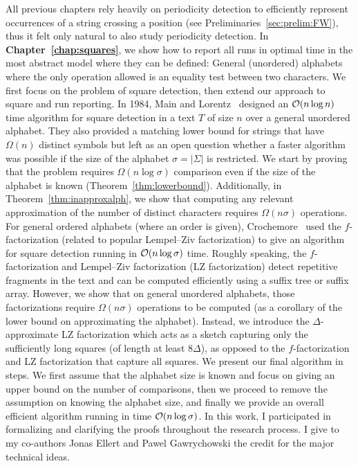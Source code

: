 All previous chapters rely heavily on periodicity detection to efficiently represent occurrences of a string crossing a position (see Preliminaries~\ref{sec:prelim:FW}), thus it felt only natural to also study periodicity detection. In \textbf{Chapter~\ref{chap:squares}}, we show how to report all runs  in optimal time in the most abstract model where they can be defined: General (unordered) alphabets where the only operation allowed is an equality test between two characters. 
We first focus on the problem of square detection, then extend our approach to square and run reporting.
In 1984, Main and Lorentz~\cite{Main1984} designed an $\mathcal{O}(n\log n)$ time algorithm for square detection in a text $T$ of size $n$ over a general unordered alphabet. They also provided a matching lower bound for strings that have $\Omega(n)$ distinct symbols but left as an open question whether a faster algorithm was possible if the size of the alphabet $\sigma=|\Sigma|$ is restricted.
We start by proving that the problem requires $\Omega(n \log \sigma)$ comparison even if the size of the alphabet is known (Theorem~\ref{thm:lowerbound}). Additionally, in Theorem~\ref{thm:inapproxalph}, we show that computing any relevant approximation of the number of distinct characters requires $\Omega(n\sigma)$ operations.
For general ordered alphabets (where an order is given), Crochemore~\cite{Crochemore1986} used the $f$-factorization (related to popular Lempel--Ziv factorization) to give an algorithm for square detection running in $\mathcal{O}(n\log \sigma)$ time. Roughly speaking, the $f$-factorization and Lempel--Ziv factorization (LZ factorization) detect repetitive fragments in the text and can be computed efficiently using a suffix tree or suffix array. However,  we show that on general unordered alphabets, those factorizations require $\Omega(n\sigma)$ operations to be computed (as a corollary of the lower bound on approximating the alphabet). %
Instead, we introduce the $\Delta$-approximate LZ factorization which acts as a sketch capturing only the sufficiently long squares (of length at least $8\Delta$), as opposed to the $f$-factorization and LZ factorization that capture all squares.
We present our final algorithm in steps. We first assume that the alphabet size is known and focus on giving an upper bound on the number of comparisons, then we proceed to remove the assumption on knowing the alphabet size, and finally we provide an overall efficient algorithm running in time $\mathcal{O}(n\log\sigma)$.
In this work, I participated in formalizing and clarifying the proofs throughout the research process. I give to my co-authors Jonas Ellert and Pawel Gawrychowski the credit for the major technical ideas.

